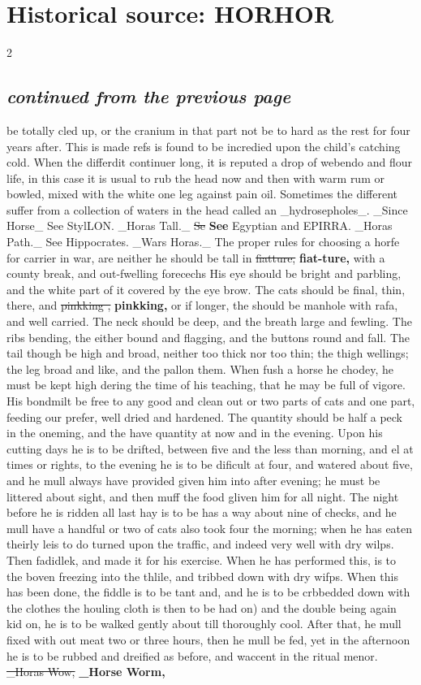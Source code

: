 \documentclass[10pt]{article}
\begin{document}
\section*{Historical source: HORHOR}
\begin{multicols}{2}
\subsection*{\textit{continued from the previous page}}
be totally cled up, or the cranium in that part not be to hard as the rest for four years after. This is made refs is found to be incredied upon the child’s catching cold. When the differdit continuer long, it is reputed a drop of webendo and flour life, in this case it is usual to rub the head now and then with warm rum or bowled, mixed with the white one leg against pain oil. Sometimes the different suffer from a collection of waters in the head called an \_hydrosepholes\_. \_Since Horse\_ See StylLON. \_Horas Tall.\_ \sout{Se} \textbf{See} Egyptian and EPIRRA. \_Horas Path.\_ See Hippocrates. \_Wars Horas.\_ The proper rules for choosing a horfe for carrier in war, are neither he should be tall in \sout{fiatture,} \textbf{fiat-ture,} with a county break, and out-fwelling forecechs His eye should be bright and parbling, and the white part of it covered by the eye brow. The cats should be final, thin, there, and \sout{pinkking ,} \textbf{pinkking,} or if longer, the should be manhole with rafa, and well carried. The neck should be deep, and the breath large and fewling. The ribs bending, the either bound and flagging, and the buttons round and fall. The tail though be high and broad, neither too thick nor too thin; the thigh wellings; the leg broad and like, and the pallon them. When fush a horse he chodey, he must be kept high dering the time of his teaching, that he may be full of vigore. His bondmilt be free to any good and clean out or two parts of cats and one part, feeding our prefer, well dried and hardened. The quantity should be half a peck in the oneming, and the have quantity at now and in the evening. Upon his cutting days he is to be drifted, between five and the less than morning, and el at times or rights, to the evening he is to be dificult at four, and watered about five, and he mull always have provided given him into after evening; he must be littered about sight, and then muff the food gliven him for all night. The night before he is ridden all last hay is to be has a way about nine of checks, and he mull have a handful or two of cats also took four the morning; when he has eaten theirly leis to do turned upon the traffic, and indeed very well with dry wilps. Then fadidlek, and made it for his exercise. When he has performed this, is to the boven freezing into the thlile, and tribbed down with dry wifps. When this has been done, the fiddle is to be tant and, and he is to be crbbedded down with the clothes the houling cloth is then to be had on) and the double being again kid on, he is to be walked gently about till thoroughly cool. After that, he mull fixed with out meat two or three hours, then he mull be fed, yet in the afternoon he is to be rubbed and dreified as before, and waccent in the ritual menor. \sout{\_Horas Wow,} \textbf{\_Horse Worm,} 
\end{multicols}
\end{document}
